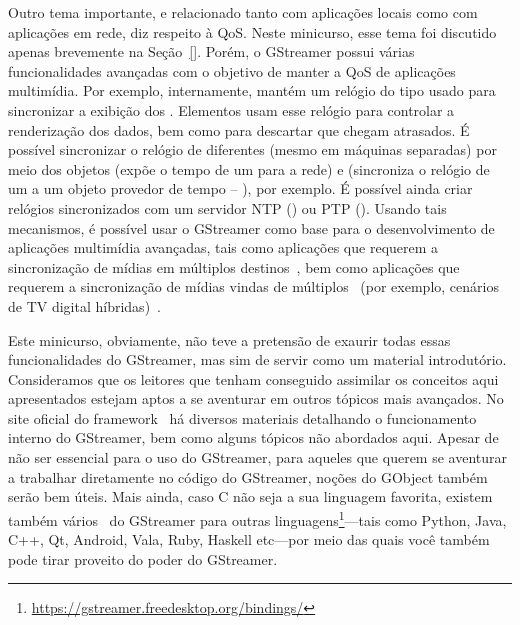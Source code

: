 Outro tema importante, e relacionado tanto com aplicações locais como com
aplicações em rede, diz respeito à QoS.  Neste minicurso, esse tema foi
discutido apenas brevemente na Seção~\ref{}.  Porém, o GStreamer possui várias
funcionalidades avançadas com o objetivo de manter a QoS de aplicações
multimídia.  Por exemplo, internamente,  mantém um relógio do
tipo  usado para sincronizar a exibição dos .
Elementos  usam esse relógio para controlar a renderização dos dados,
bem como para descartar  que chegam atrasados. É possível
sincronizar o relógio de  diferentes (mesmo em máquinas
separadas) por meio dos objetos  (expõe o tempo de um
 para a rede) e  (sincroniza o relógio de um
 a um objeto provedor de tempo -- ), por
exemplo. É possível ainda criar relógios sincronizados com um servidor NTP
() ou PTP ().  Usando tais mecanismos, é possível
usar o GStreamer como base para o desenvolvimento de aplicações multimídia
avançadas, tais como aplicações que requerem a sincronização de mídias em
múltiplos destinos~\cite{}, bem como aplicações que requerem a sincronização de
mídias vindas de múltiplos ~(por exemplo, cenários de TV digital
híbridas)~\cite{}.

Este minicurso, obviamente, não teve a pretensão de exaurir todas essas
funcionalidades do GStreamer, mas sim de servir como um material introdutório.
Consideramos que os leitores que tenham conseguido assimilar os conceitos aqui
apresentados estejam aptos a se aventurar em outros tópicos mais avançados.  No
site oficial do framework~\cite{gstreamer} há diversos materiais detalhando o
funcionamento interno do GStreamer, bem como alguns tópicos não abordados aqui.
Apesar de não ser essencial para o uso do GStreamer, para aqueles que querem se
aventurar a trabalhar diretamente no código do GStreamer, noções do
 GObject também serão bem úteis.  Mais ainda, caso C não seja a
sua linguagem favorita, existem também vários~ do GStreamer para
outras
linguagens\footnote{\url{https://gstreamer.freedesktop.org/bindings/}}---tais 
como Python, Java, C++, Qt, Android, Vala, Ruby, Haskell etc---por meio das
quais você também pode tirar proveito do poder do GStreamer.

